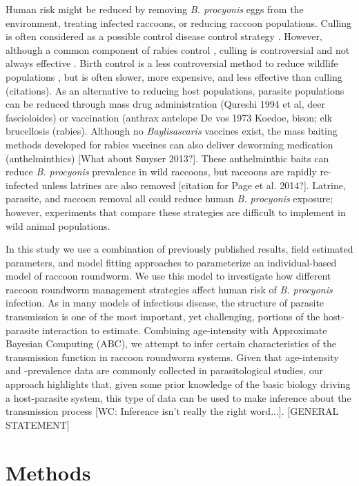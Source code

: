 \documentclass[11pt]{article}
\begin{document}
Human risk might be reduced by removing \emph{B. procyonis} eggs from
the environment, treating infected raccoons, or reducing raccoon
populations. Culling is often considered as a possible control
disease control strategy \citep{Wasserberg2009,Langwig2015}. However, although a common component of
rabies control \citep{Rosatte1986}, culling is controversial and not
always effective \citep{Choisy2006a,Beeton2011,Morters2013}. Birth control is a less controversial method to
reduce wildlife populations \citep{Smith2002a}, but is often slower, more
expensive, and less effective than culling (citations). As an alternative to
reducing host populations, parasite populations can be reduced through
mass drug administration (Qureshi 1994 et al, deer fascioloides) or
vaccination (anthrax antelope De vos 1973 Koedoe, bison; elk brucellosis
(rabies). Although no \emph{Baylisascaris} vaccines exist, the mass
baiting methods developed for rabies vaccines can also deliver deworming
medication (anthelminthics) \citep{Smyser2015} [What about Smyser 2013?]. These anthelminthic
baits can reduce \emph{B. procyonis} prevalence in wild raccoons, but
raccoons are rapidly re-infected unless latrines are also removed \citep{Page2011} [citation for Page et al. 2014?]. Latrine, parasite, and raccoon removal
all could reduce human \emph{B. procyonis} exposure; however,
experiments that compare these strategies are difficult to implement in
wild animal populations.

In this study we use a combination of previously published results, field estimated parameters, and model fitting approaches to parameterize an individual-based model of raccoon roundworm.  We use this model to investigate how different raccoon roundworm management strategies affect human risk of \emph{B. procyonis} infection. As in many models of infectious disease, the structure of parasite transmission is one of the most important, yet challenging, portions of the host-parasite interaction to estimate.  Combining age-intensity with Approximate Bayesian Computing (ABC), we attempt to infer certain characteristics of the transmission function in raccoon roundworm systems.  Given that age-intensity and -prevalence data are commonly collected in parasitological studies, our approach highlights that, given some prior knowledge of the basic biology driving a host-parasite system, this type of data can be used to make inference about the transmission process [WC: Inference isn't really the right word...]. [GENERAL STATEMENT]

\section{Methods}
\end{document}
